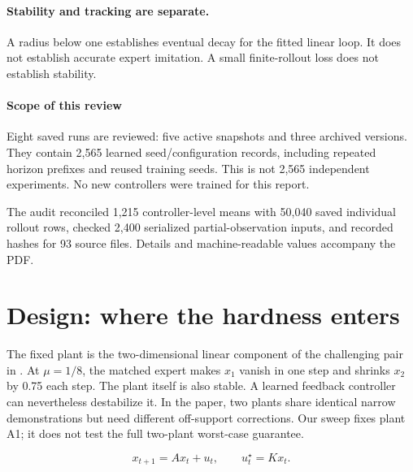 \documentclass{l4dc2026}
\begin{document}
\paragraph{Stability and tracking are separate.}
A radius below one establishes eventual decay for the fitted linear loop. It does not establish accurate expert imitation. A small finite-rollout loss does not establish stability.

\paragraph{Scope of this review}
Eight saved runs are reviewed: five active snapshots and three archived versions. They contain 2,565 learned seed/configuration records, including repeated horizon prefixes and reused training seeds. This is not 2,565 independent experiments. No new controllers were trained for this report.

{\small The audit reconciled 1,215 controller-level means with 50,040 saved individual rollout rows, checked 2,400 serialized partial-observation inputs, and recorded hashes for 93 source files. Details and machine-readable values accompany the PDF.\par}

\section{Design: where the hardness enters}
The fixed plant is the two-dimensional linear component of the challenging pair in \citet{simchowitz2025}. At $\mu=1/8$, the matched expert makes $x_1$ vanish in one step and shrinks $x_2$ by 0.75 each step. The plant itself is also stable. A learned feedback controller can nevertheless destabilize it. In the paper, two plants share identical narrow demonstrations but need different off-support corrections. Our sweep fixes plant A1; it does not test the full two-plant worst-case guarantee.

\[x_{t+1}=Ax_t+u_t,\qquad u_t^\star=Kx_t.\]
\end{document}
